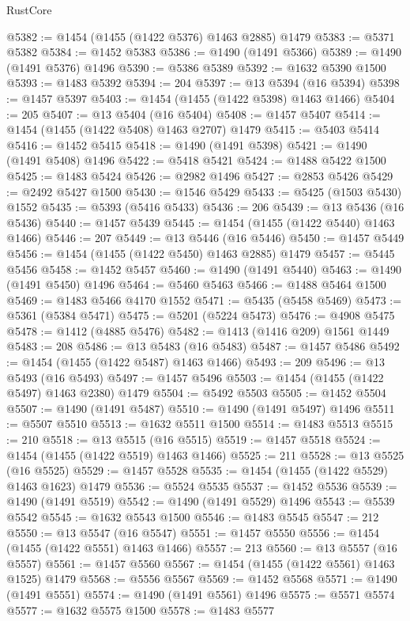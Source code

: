 \begin{lexlean}{RustCore}
\begin{coremodule}
@5382 := @1454 (@1455 (@1422 @5376) @1463 @2885) @1479
@5383 := @5371 @5382
@5384 := @1452 @5383
@5386 := @1490 (@1491 @5366)
@5389 := @1490 (@1491 @5376) @1496
@5390 := @5386 @5389
@5392 := @1632 @5390 @1500
@5393 := @1483 @5392
@5394 := 204
@5397 := @13 @5394 (@16 @5394)
@5398 := @1457 @5397
@5403 := @1454 (@1455 (@1422 @5398) @1463 @1466)
@5404 := 205
@5407 := @13 @5404 (@16 @5404)
@5408 := @1457 @5407
@5414 := @1454 (@1455 (@1422 @5408) @1463 @2707) @1479
@5415 := @5403 @5414
@5416 := @1452 @5415
@5418 := @1490 (@1491 @5398)
@5421 := @1490 (@1491 @5408) @1496
@5422 := @5418 @5421
@5424 := @1488 @5422 @1500
@5425 := @1483 @5424
@5426 := @2982 @1496
@5427 := @2853 @5426
@5429 := @2492 @5427 @1500
@5430 := @1546 @5429
@5433 := @5425 (@1503 @5430) @1552
@5435 := @5393 (@5416 @5433)
@5436 := 206
@5439 := @13 @5436 (@16 @5436)
@5440 := @1457 @5439
@5445 := @1454 (@1455 (@1422 @5440) @1463 @1466)
@5446 := 207
@5449 := @13 @5446 (@16 @5446)
@5450 := @1457 @5449
@5456 := @1454 (@1455 (@1422 @5450) @1463 @2885) @1479
@5457 := @5445 @5456
@5458 := @1452 @5457
@5460 := @1490 (@1491 @5440)
@5463 := @1490 (@1491 @5450) @1496
@5464 := @5460 @5463
@5466 := @1488 @5464 @1500
@5469 := @1483 @5466 @4170 @1552
@5471 := @5435 (@5458 @5469)
@5473 := @5361 (@5384 @5471)
@5475 := @5201 (@5224 @5473)
@5476 := @4908 @5475
@5478 := @1412 (@4885 @5476)
@5482 := @1413 (@1416 @209) @1561 @1449
@5483 := 208
@5486 := @13 @5483 (@16 @5483)
@5487 := @1457 @5486
@5492 := @1454 (@1455 (@1422 @5487) @1463 @1466)
@5493 := 209
@5496 := @13 @5493 (@16 @5493)
@5497 := @1457 @5496
@5503 := @1454 (@1455 (@1422 @5497) @1463 @2380) @1479
@5504 := @5492 @5503
@5505 := @1452 @5504
@5507 := @1490 (@1491 @5487)
@5510 := @1490 (@1491 @5497) @1496
@5511 := @5507 @5510
@5513 := @1632 @5511 @1500
@5514 := @1483 @5513
@5515 := 210
@5518 := @13 @5515 (@16 @5515)
@5519 := @1457 @5518
@5524 := @1454 (@1455 (@1422 @5519) @1463 @1466)
@5525 := 211
@5528 := @13 @5525 (@16 @5525)
@5529 := @1457 @5528
@5535 := @1454 (@1455 (@1422 @5529) @1463 @1623) @1479
@5536 := @5524 @5535
@5537 := @1452 @5536
@5539 := @1490 (@1491 @5519)
@5542 := @1490 (@1491 @5529) @1496
@5543 := @5539 @5542
@5545 := @1632 @5543 @1500
@5546 := @1483 @5545
@5547 := 212
@5550 := @13 @5547 (@16 @5547)
@5551 := @1457 @5550
@5556 := @1454 (@1455 (@1422 @5551) @1463 @1466)
@5557 := 213
@5560 := @13 @5557 (@16 @5557)
@5561 := @1457 @5560
@5567 := @1454 (@1455 (@1422 @5561) @1463 @1525) @1479
@5568 := @5556 @5567
@5569 := @1452 @5568
@5571 := @1490 (@1491 @5551)
@5574 := @1490 (@1491 @5561) @1496
@5575 := @5571 @5574
@5577 := @1632 @5575 @1500
@5578 := @1483 @5577

\end{coremodule}
\end{lexlean}
